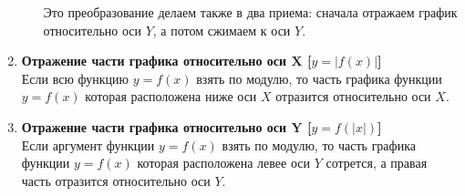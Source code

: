 \documentclass[10pt, a4paper]{article}
\begin{document}
\begin{enumerate}
\begin{enumerate}[label=\asbuk*)]
\begin{minipage}[t]{0.65\textwidth}
			Это преобразование делаем также в два приема: сначала отражаем график относительно оси $Y$, а потом сжимаем к оси $Y$.
		\end{minipage}
		\begin{minipage}[t]{0.25\textwidth}
			\begin{flushright}
			\end{flushright}
		\end{minipage}
	\end{enumerate}
	\item \textbf{Отражение части графика относительно оси $\boldsymbol X$ [\boldmath$y=|f(x)|$]}\\[1em]
	Если всю функцию $y=f(x)$ взять по модулю, то часть графика функции $y=f(x)$ которая расположена ниже оси $X$ отразится относительно оси $X$.
	\item \textbf{Отражение части графика относительно оси $\boldsymbol Y$ [\boldmath$y=f(|x|)$]}\\[1em]
	Если аргумент функции $y=f(x)$ взять по модулю, то часть графика функции $y=f(x)$ которая расположена левее оси $Y$ сотрется, а правая часть отразится относительно оси $Y$.
\end{enumerate}
\end{document}
